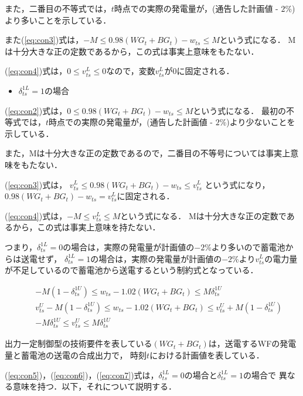 \documentclass[a4paper,12pt,showkeys]{jreport}
\begin{document}
また，二番目の不等式では，$t$時点での実際の発電量が，(通告した計画値 - $2\%$)より多いことを示している．

また(\ref{eq:con3})式は，$-M \le 0.98 (WG_t + BG_t) - w_{ts} \le M$という式になる．
Mは十分大きな正の定数であるから，この式は事実上意味をもたない．

(\ref{eq:con4})式は，$0 \le v^L_{ts} \le 0$なので，変数$v^L_{ts}$が$0$に固定される．

\begin{itemize}
\item $\delta^{1L}_{ts}$$=1$の場合
\end{itemize}

(\ref{eq:con2})式は，$0 \le 0.98 (WG_t + BG_t) - w_{ts}\le M$という式になる．
最初の不等式では，$t$時点での実際の発電量が，(通告した計画値 - $2\%$)より少ないことを示している．

また，Mは十分大きな正の定数であるので，二番目の不等号については事実上意味をもたない．

(\ref{eq:con3})式は， $v^L_{ts} \le 0.98 (WG_t + BG_t) - w_{ts} \le v^L_{ts}$ という式になり，
$0.98 (WG_t + BG_t) - w_{ts} = v^L_{ts}$に固定される．

(\ref{eq:con4})式は，$-M \le v^L_{ts} \le M$という式になる．
Mは十分大きな正の定数であるから，この式は事実上意味を持たない．

つまり，$\delta^{1L}_{ts}$$=0$の場合は，実際の発電量が計画値の$-2$\%より多いので蓄電池からは送電せず，
$\delta^{1L}_{ts}$$=1$の場合は，実際の発電量が計画値の$-2$\%より$v^L_{ts}$の電力量が不足しているので蓄電池から送電するという制約式となっている．

\begin{eqnarray}
&& - M (1 - \delta^{1U}_{ts}) \le w_{ts} - 1.02 (WG_t + BG_t) \le M \delta^{1U}_{ts}
\label{eq:con5} \\
&& v^U_{ts} - M (1 - \delta^{1U}_{ts}) \le w_{ts} - 1.02 (WG_t + BG_t) \le v^U_{ts} + M (1 - \delta^{1U}_{ts})
\label{eq:con6} \\
&& - M \delta^{1U}_{ts} \le v^U_{ts} \le M \delta^{1U}_{ts}
\label{eq:con7}
\end{eqnarray}

出力一定制御型の技術要件を表している$(WG_t + BG_t)$は，送電するWFの発電量と蓄電池の送電の合成出力で，
時刻$t$における計画値を表している．

(\ref{eq:con5})，(\ref{eq:con6})，(\ref{eq:con7})式は，$\delta^{1L}_{ts}$$=0$の場合と$\delta^{1L}_{ts}$$=1$の場合で
異なる意味を持つ．以下，それについて説明する．
\end{document}
